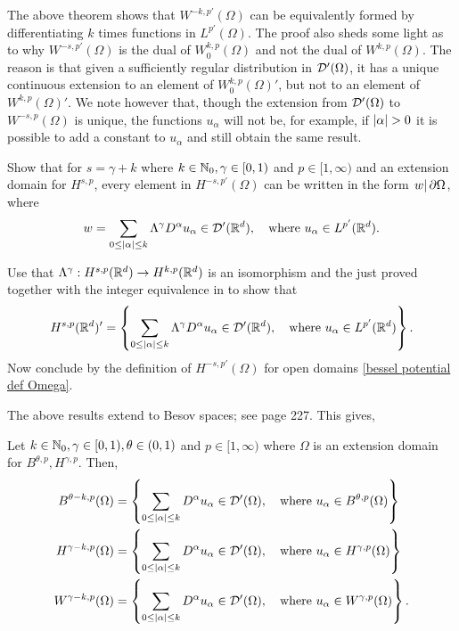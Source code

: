 \documentclass[
    a4paper,
    DIV=14,
    abstract=true,
    numbers=noenddot
]{scrartcl}
\begin{document}
The above theorem shows that $W^{-k,p'}(\Omega )$ can be equivalently formed by differentiating $k$ times functions in $L^{p'}(\Omega )$. The proof also sheds some light as to why $W^{-s,p'}(\Omega )$ is the dual of $W^{k,p}_0(\Omega )$ and not the dual of $W^{k,p}(\Omega )$. The reason is that given a sufficiently regular distribution in $\mathcal{D}'(\Omega )$, it has a unique continuous extension to an element of $W_0^{k,p}(\Omega )'$, but not to an element of $W^{k,p}(\Omega )'$. We note however that, though the extension from $\mathcal{D}'(\Omega )$ to $W^{-s,p}(\Omega )$ is unique, the functions $u_\alpha$ will not be, for example, if ${\left| \alpha \right|}>0$ it is possible to add a constant to $u_\alpha$ and still obtain the same result.
\begin{exercise}
    Show that for $s= \gamma +k$ where $k \in \mathbb{N}_0, \gamma \in [0,1)$  and $p \in [1,\infty)$ and an extension domain for $H^{s,p}$,    every element in $H^{-s,p'}(\Omega )$ can be written in the form $\left.w\right|{\partial \Omega }$, where
    \begin{align*}
        w=\sum_{0\leq{\left| \alpha \right|}\leq k} \Lambda^{\gamma } D^\alpha u_\alpha\in \mathcal{D}'(\mathbb{R}^d ),\quad \text{where }    u_\alpha \in L^{p'}(\mathbb{R}^d ).
    \end{align*}
\end{exercise}
\begin{hint}
    Use that $\Lambda ^{\gamma }: H^{s,p}(\mathbb{R}^d) \to H^{k ,p}(\mathbb{R}^d)$ is an isomorphism and the just proved  together with the integer equivalence in  to show that
    \begin{align*}
        H^{s,p}(\mathbb{R}^d)' = \left\{ \sum_{0\leq{\left| \alpha \right|}\leq k} \Lambda^{\gamma } D^\alpha u_\alpha\in \mathcal{D}'(\mathbb{R}^d ),\quad \text{where }    u_\alpha \in L^{p'}(\mathbb{R}^d )\right\}.
    \end{align*}
    Now conclude by the definition of $H^{-s,p'}(\Omega )$ for open domains \ref{bessel potential def Omega}.
\end{hint}
The above results extend to Besov spaces; see \cite{agranovich2015sobolev} page 227. This gives,
\begin{theorem}
    Let  $k \in \mathbb{N}_0, \gamma \in [0,1), \theta \in (0,1)$ and $p \in [1,\infty)$ where $\Omega$ is an extension domain for $B^{\theta   ,p}, H^{\gamma ,p}$. Then,
    \begin{align*}
        B^{\theta  -k,p}(\Omega ) & = \left\{ \sum_{0\leq{\left| \alpha \right|}\leq k} D^\alpha u_\alpha\in \mathcal{D}'(\Omega ),\quad \text{where }    u_\alpha \in B^{\theta  ,p}(\Omega )\right\} \\
        H^{\gamma -k,p}(\Omega )  & = \left\{ \sum_{0\leq{\left| \alpha \right|}\leq k} D^\alpha u_\alpha\in \mathcal{D}'(\Omega ),\quad \text{where }    u_\alpha \in H^{\gamma ,p}(\Omega )\right\}  \\
        W^{\gamma -k,p}(\Omega )  & = \left\{ \sum_{0\leq{\left| \alpha \right|}\leq k} D^\alpha u_\alpha\in \mathcal{D}'(\Omega ),\quad \text{where }    u_\alpha \in W^{\gamma ,p}(\Omega )\right\}.
    \end{align*}
\end{theorem}
\end{document}
